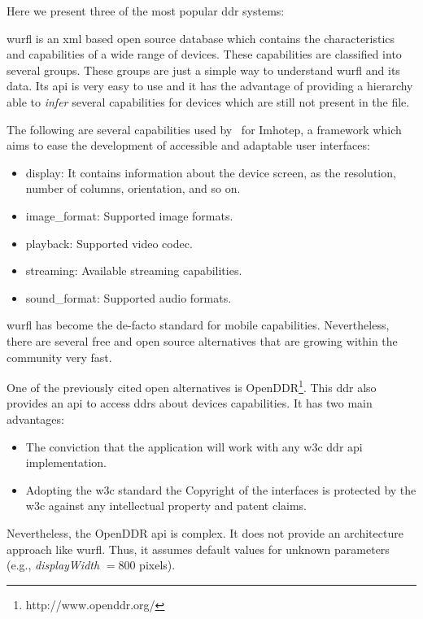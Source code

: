 Here we present three of the most popular \ac{ddr} systems:


\ac{wurfl} is an \ac{xml} based
open source database which contains the characteristics and capabilities of a 
wide range of devices. These capabilities are classified into several groups. 
These groups are just a simple way to understand \ac{wurfl} and its data. Its 
\ac{api} is very easy to use and it has the advantage of providing a hierarchy 
able to \textit{infer} several capabilities for devices which are still not 
present in the file.

The following are several capabilities used by~\citet{almeida_imhotep_2011} for
Imhotep, a framework which aims to ease the development of accessible and adaptable
user interfaces:

\begin{itemize}
 \item display: It contains information about the device screen, as the resolution,
 number of columns, orientation, and so on.
 \item image\_format: Supported image formats.
 \item playback: Supported video codec.
 \item streaming: Available streaming capabilities.
 \item sound\_format: Supported audio formats.
\end{itemize}

\ac{wurfl} has become the de-facto standard for mobile capabilities. Nevertheless,
there are several free and open source alternatives that are growing within the
community very fast.


One of the previously cited open alternatives is OpenDDR\footnote{http://www.openddr.org/}.
This \ac{ddr} also provides an \ac{api} to access \ac{ddr}s about devices
capabilities. It has two main advantages:

\begin{itemize}
 \item The conviction that the application will work with any \ac{w3c} \ac{ddr} 
 \ac{api} implementation.
 \item Adopting the \ac{w3c} standard the Copyright of the interfaces is 
 protected by the \ac{w3c} against any intellectual property and patent claims.
\end{itemize}

Nevertheless, the OpenDDR \ac{api} is complex. It does not provide an architecture
approach like \ac{wurfl}. Thus, it assumes default values for unknown parameters
(e.g., \textit{displayWidth} $= 800$ pixels).

